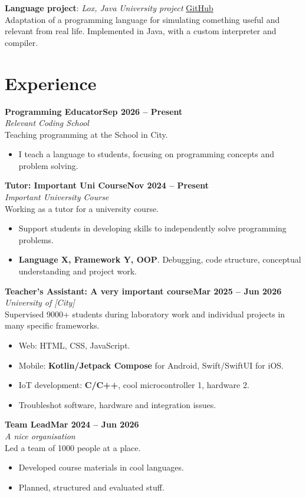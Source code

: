 \documentclass[10pt,a4paper]{article}
\newcommand{\entry}[4]{
    \textbf{#1}\hfill\textbf{#2}\\[0pt]
    \textit{#3}\\[-0.5pt]
    #4
    \vspace{4.5pt}
}
\newcommand{\project}[5]{
    \textbf{#1}: \textit{#2}
    \hfill
    \textit{#3}
    \quad
    #4\\[-1pt]
    #5 \vspace{3pt}
}
\begin{document}
\project
{Language project}
{Lox, Java}
{University project}
{\href{https://github.com}{GitHub}}
{Adaptation of a programming language for simulating comething useful and relevant from real life. Implemented in Java, with a custom interpreter and compiler.}

\section{Experience}

\entry{Programming Educator}{Sep 2026 -- Present}
{Relevant Coding School}{Teaching programming at the School in City.
\begin{itemize}
    \item I teach a language to students, focusing on programming concepts and problem solving.
\end{itemize}
}
\entry{Tutor: Important Uni Course}{Nov 2024 -- Present}
{Important University Course}{
    Working as a tutor for a university course.
    \begin{itemize}
    \item Support students in developing skills to independently solve programming problems.
    \item \textbf{Language X, Framework Y, OOP}. Debugging, code structure, conceptual understanding and project work.
    \end{itemize}
}
\entry{Teacher's Assistant: A very important course}{Mar 2025 -- Jun 2026}
{University of [City]}{Supervised 9000+ students during laboratory work and individual projects in many specific frameworks.
\begin{itemize}
    \item Web: HTML, CSS, JavaScript.
    \item Mobile: \textbf{Kotlin/Jetpack Compose} for Android, Swift/SwiftUI for iOS.
    \item IoT development: \textbf{C/C++}, cool microcontroller 1, hardware 2.
    \item Troubleshot software, hardware and integration issues.
\end{itemize}
}
\entry{Team Lead}{Mar 2024 -- Jun 2026}
{A nice organisation}{Led a team of 1000 people at a place.
\begin{itemize}
    \item Developed course materials in cool languages.
    \item Planned, structured and evaluated stuff.
\end{itemize}
}
\end{document}
